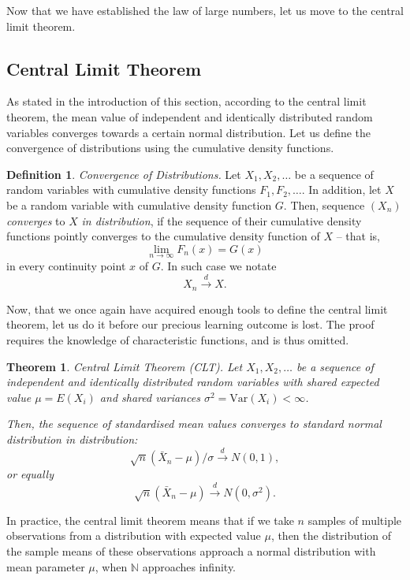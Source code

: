 \documentclass[12pt,a4paper,leqno]{report}
\newcommand{\N}{\mathbb{N}}
\newcommand{\var}{\mathrm{Var}}
\theoremstyle{plain}
\newtheorem{lause}[equation]{Theorem}
\theoremstyle{definition}
\newtheorem{maar}[equation]{Definition}
\begin{document}
Now that we have established the law of large numbers, let us move to the central limit theorem.

\subsection{Central Limit Theorem}

As stated in the introduction of this section, according to the central limit theorem, the mean value of independent and identically distributed random variables converges towards a certain normal distribution. Let us define the convergence of distributions using the cumulative density functions.

\begin{maar}
\emph{Convergence of Distributions.}  Let $X_1, X_2, \dots$ be a sequence of random variables with cumulative density functions $F_1, F_2, \dots$. In addition, let $X$ be a random variable with cumulative density function $G$. Then, sequence $(X_n)$ \emph{converges} to $X$ \emph{in distribution}, if the sequence of their cumulative density functions pointly converges to the cumulative density function of $X$ -- that is,
\[
\lim_{n\rightarrow \infty} F_n(x) = G(x)
\]
in every continuity point $x$ of $G$. In such case we notate
\[
X_n \overset{d}{\longrightarrow} X.
\]
\end{maar}

Now, that we once again have acquired enough tools to define the central limit theorem, let us do it before our precious learning outcome is lost. The proof requires the knowledge of characteristic functions, and is thus omitted.

\begin{lause} \label{lause:clt}
Central Limit Theorem (CLT). Let $X_1, X_2, \dots$ be a sequence of independent and identically distributed random variables with shared expected value $\mu = E(X_i)$ and shared variances $\sigma^2 = \var(X_i) < \infty$.

Then, the sequence of standardised mean values converges to standard normal distribution in distribution:
\[
\sqrt{n}(\bar{X}_n - \mu) /\sigma \overset{d}{\longrightarrow} N(0,1),
\]
or equally
\[
\sqrt{n}(\bar{X}_n - \mu) \overset{d}{\longrightarrow} N(0,\sigma^2).
\]
\end{lause}

In practice, the central limit theorem means that if we take $n$ samples of multiple observations from a distribution with expected value $\mu$, then the distribution of the sample means of these observations approach a normal distribution with mean parameter $\mu$, when $\N$ approaches infinity.
\end{document}
